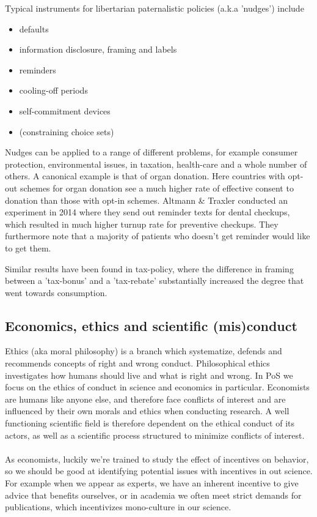 \documentclass[12pt, a4paper]{article}
\begin{document}
\begin{multicols}{2}

Typical instruments for libertarian paternalistic policies (a.k.a 'nudges') include
\begin{itemize}
\item defaults
\item information disclosure, framing and labels
\item reminders
\item cooling-off periods
\item self-commitment devices 
\item (constraining choice sets)
\end{itemize}
Nudges can be applied to a range of different problems, for example consumer protection, environmental issues, in taxation, health-care and a whole number of others. A canonical example is that of organ donation. Here countries with opt-out schemes for organ donation see a much higher rate of effective consent to donation than those with opt-in schemes. Altmann \& Traxler conducted an experiment in 2014 where they send out reminder texts for dental checkups, which resulted in much higher turnup rate for preventive checkups. They furthermore note that a majority of patients who doesn't get reminder would like to get them. 

Similar results have been found in tax-policy, where the difference in framing between a 'tax-bonus' and a 'tax-rebate' substantially increased the degree that went towards consumption. 

\subsection{Economics, ethics and scientific (mis)conduct}
Ethics (aka moral philosophy) is a branch which systematize, defends and recommends concepts of right and wrong conduct. Philosophical ethics investigates how humans should live and what is right and wrong. In PoS we focus on the ethics of conduct in science and economics in particular. Economists are humans like anyone else, and therefore face conflicts of interest and are influenced by their own morals and ethics when conducting research. A well functioning scientific field is therefore dependent on the ethical conduct of its actors, as well as a scientific process structured to minimize conflicts of interest. 
\\ \\
As economists, luckily we're trained to study the effect of incentives on behavior, so we should be good at identifying potential issues with incentives in out science. For example when we appear as experts, we have an inherent incentive to give advice that benefits ourselves, or in academia we often meet strict demands for publications, which incentivizes mono-culture in our science. 


\end{multicols}
\end{document}
